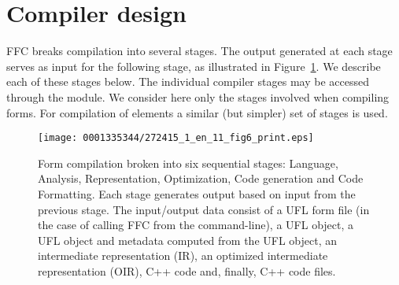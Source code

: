 \section{Compiler design}

FFC breaks compilation into several stages. The output
generated at each stage serves as input for the following stage, as
illustrated in Figure~\ref{fig:logg-1:compilerstages}. We describe each of
these stages below. The individual compiler stages may be accessed
through the  module. We consider here only the
stages involved when compiling forms. For compilation of elements a
similar (but simpler) set of stages is used.

\begin{figure}[!t]
\bwfig
\centering
\texttt{[image: 0001335344/272415\_1\_en\_11\_fig6\_print.eps]}
\caption{Form compilation broken into six sequential stages:
    Language, Analysis, Representation, Optimization, Code
    generation and Code Formatting. Each stage generates output
    based on input from the previous stage. The input/output data
    consist of a UFL form file (in the case of calling FFC from the
    command-line), a UFL object, a UFL object and metadata computed
    from the UFL object, an intermediate representation (IR), an
    optimized intermediate representation (OIR), C++ code and,
    finally, C++ code files.}
  \label{fig:logg-1:compilerstages}
\end{figure}

